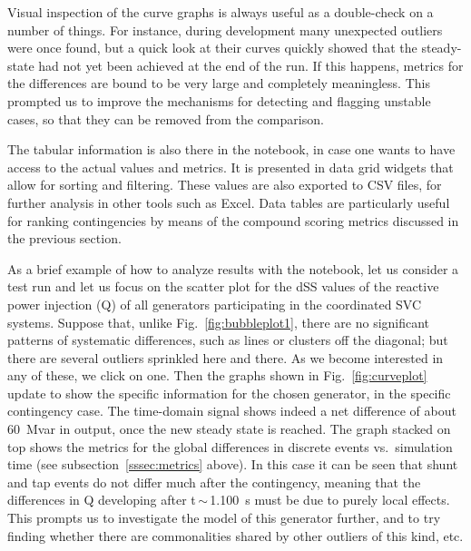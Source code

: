 \documentclass[conference]{IEEEtran}
\begin{document}
Visual inspection of the curve graphs is always useful as a double-check on a
number of things. For instance, during development many unexpected outliers were
once found, but a quick look at their curves quickly showed that the
steady-state had not yet been achieved at the end of the run. If this happens,
metrics for the differences are bound to be very large and completely
meaningless.  This prompted us to improve the mechanisms for detecting and
flagging unstable cases, so that they can be removed from the comparison.

The tabular information is also there in the notebook, in case one wants to have
access to the actual values and metrics. It is presented in data grid widgets
that allow for sorting and filtering.  These values are also exported to CSV
files, for further analysis in other tools such as Excel.  Data tables are
particularly useful for ranking contingencies by means of the compound scoring
metrics discussed in the previous section.

As a brief example of how to analyze results with the notebook, let us consider
a test run and let us focus on the scatter plot for the dSS values of the
reactive power injection (Q) of all generators participating in the coordinated
SVC systems. Suppose that, unlike Fig.~\ref{fig:bubbleplot1}, there are no
significant patterns of systematic differences, such as lines or clusters off
the diagonal; but there are several outliers sprinkled here and there.  As we
become interested in any of these, we click on one. Then the graphs shown in
Fig.~\ref{fig:curveplot} update to show the specific information for the chosen
generator, in the specific contingency case. The time-domain signal shows indeed
a net difference of about \SI{60}{Mvar} in output, once the new steady state is
reached. The graph stacked on top shows the metrics for the global differences
in discrete events vs.~simulation time (see subsection~\ref{sssec:metrics}
above).  In this case it can be seen that shunt and tap events do not differ
much after the contingency, meaning that the differences in Q developing after
t\,$\sim$\,\SI{1,100}{s} must be due to purely local effects. This prompts us to
investigate the model of this generator further, and to try finding whether
there are commonalities shared by other outliers of this kind, etc.
\end{document}
